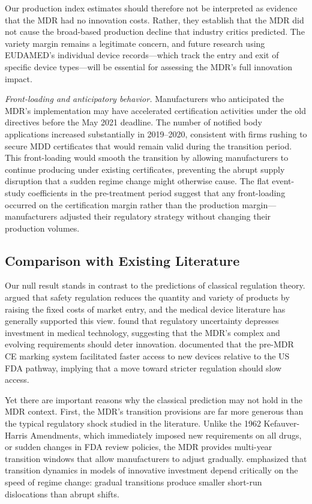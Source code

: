 \documentclass[12pt]{article}
\begin{document}
Our production index estimates should therefore not be interpreted as evidence that the MDR had no innovation costs. Rather, they establish that the MDR did not cause the broad-based production decline that industry critics predicted. The variety margin remains a legitimate concern, and future research using EUDAMED's individual device records---which track the entry and exit of specific device types---will be essential for assessing the MDR's full innovation impact.

\textit{Front-loading and anticipatory behavior.} Manufacturers who anticipated the MDR's implementation may have accelerated certification activities under the old directives before the May 2021 deadline. The number of notified body applications increased substantially in 2019--2020, consistent with firms rushing to secure MDD certificates that would remain valid during the transition period. This front-loading would smooth the transition by allowing manufacturers to continue producing under existing certificates, preventing the abrupt supply disruption that a sudden regime change might otherwise cause. The flat event-study coefficients in the pre-treatment period suggest that any front-loading occurred on the certification margin rather than the production margin---manufacturers adjusted their regulatory strategy without changing their production volumes.

\subsection{Comparison with Existing Literature}

Our null result stands in contrast to the predictions of classical regulation theory. \citet{peltzman1976toward} argued that safety regulation reduces the quantity and variety of products by raising the fixed costs of market entry, and the medical device literature has generally supported this view. \citet{stern2017innovation} found that regulatory uncertainty depresses investment in medical technology, suggesting that the MDR's complex and evolving requirements should deter innovation. \citet{grennan2020regulating} documented that the pre-MDR CE marking system facilitated faster access to new devices relative to the US FDA pathway, implying that a move toward stricter regulation should slow access.

Yet there are important reasons why the classical prediction may not hold in the MDR context. First, the MDR's transition provisions are far more generous than the typical regulatory shock studied in the literature. Unlike the 1962 Kefauver-Harris Amendments, which immediately imposed new requirements on all drugs, or sudden changes in FDA review policies, the MDR provides multi-year transition windows that allow manufacturers to adjust gradually. \citet{atkeson2019transition} emphasized that transition dynamics in models of innovative investment depend critically on the speed of regime change: gradual transitions produce smaller short-run dislocations than abrupt shifts.
\end{document}
